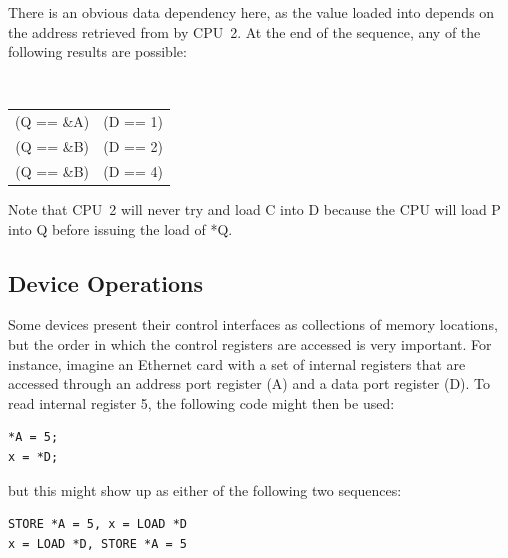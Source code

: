 There is an obvious data dependency here,
as the value loaded into  depends on
the address retrieved from  by CPU~2.
At the end of the sequence, any of the
following results are possible:

\vspace{5pt}
\begin{minipage}[t]{\columnwidth}
\tt
\scriptsize
\begin{tabular}{c@{ and }c}
	(Q == \&A) & (D == 1) \\
	(Q == \&B) & (D == 2) \\
	(Q == \&B) & (D == 4) \\
\end{tabular}
\end{minipage}
\vspace{5pt}

Note that CPU~2 will never try and load C into D because the CPU will load P
into Q before issuing the load of *Q.

\subsection{Device Operations}
\label{sec:advsync:Device Operations}

Some devices present their control interfaces as collections of memory
locations, but the order in which the control registers are accessed is very
important.  For instance, imagine an Ethernet card with a set of internal
registers that are accessed through an address port register (A) and a data
port register (D).  To read internal register 5, the following code might then
be used:

\vspace{5pt}
\begin{minipage}[t]{\columnwidth}
\scriptsize
\begin{verbatim}
*A = 5;
x = *D;
\end{verbatim}
\end{minipage}
\vspace{5pt}

but this might show up as either of the following two sequences:

\vspace{5pt}
\begin{minipage}[t]{\columnwidth}
\scriptsize
\begin{verbatim}
STORE *A = 5, x = LOAD *D
x = LOAD *D, STORE *A = 5
\end{verbatim}
\end{minipage}
\vspace{5pt}

